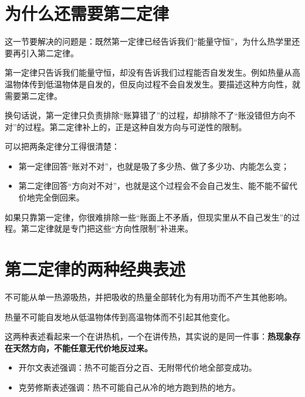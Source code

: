 \documentclass[lang=cn,11pt]{elegantbook}
\newcommand{\bridge}[1]{\begin{note}#1\end{note}}
\begin{document}
\section{为什么还需要第二定律}

这一节要解决的问题是：既然第一定律已经告诉我们“能量守恒”，为什么热学里还要再引入第二定律。

第一定律只告诉我们能量守恒，却没有告诉我们过程能否自发发生。例如热量从高温物体传到低温物体是自发的，但反向过程不会自发发生。要描述这种方向性，就需要第二定律。

\bridge{换句话说，第一定律只负责排除“账算错了”的过程，却排除不了“账没错但方向不对”的过程。第二定律补上的，正是这种自发方向与可逆性的限制。}

可以把两条定律分工得很清楚：
\begin{itemize}
  \item 第一定律回答“账对不对”，也就是吸了多少热、做了多少功、内能怎么变；
  \item 第二定律回答“方向对不对”，也就是这个过程会不会自己发生、能不能不留代价地完全倒回来。
\end{itemize}

\begin{remark}
如果只靠第一定律，你很难排除一些“账面上不矛盾，但现实里从不自己发生”的过程。第二定律就是专门把这些“方向性限制”补进来。
\end{remark}

\section{第二定律的两种经典表述}

\begin{theorem}[开尔文表述]\label{thm:kelvin-statement}
不可能从单一热源吸热，并把吸收的热量全部转化为有用功而不产生其他影响。
\end{theorem}

\begin{theorem}[克劳修斯表述]\label{thm:clausius-statement}
热量不可能自发地从低温物体传到高温物体而不引起其他变化。
\end{theorem}

这两种表述看起来一个在讲热机，一个在讲传热，其实说的是同一件事：\textbf{热现象存在天然方向，不能任意无代价地反过来。}

\begin{itemize}
  \item 开尔文表述强调：热不可能百分之百、无附带代价地全部变成功。
  \item 克劳修斯表述强调：热不可能自己从冷的地方跑到热的地方。
\end{itemize}
\end{document}
